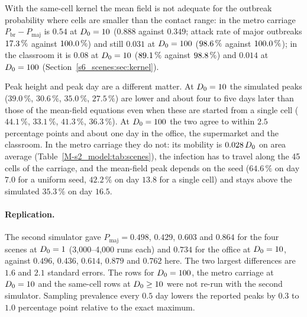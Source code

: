 With the same-cell kernel the mean field is not adequate for the outbreak probability where cells are smaller
than the contact range: in the metro carriage
$P_{\mathrm{br}}-P_{\mathrm{maj}}$ is $0.54$ at $D_0=10$ ($0.888$ against $0.349$; attack rate of major
outbreaks $17.3\,\%$ against $100.0\,\%$) and still $0.031$ at $D_0=100$ ($98.6\,\%$ against $100.0\,\%$); in the
classroom it is $0.08$ at $D_0=10$ ($89.1\,\%$ against $98.8\,\%$) and $0.014$ at $D_0=100$
(Section~\ref{s6_scenes:sec:kernel}).

Peak height and peak day are a different matter. At $D_0=10$ the simulated peaks ($39.0\,\%$, $30.6\,\%$, $35.0\,\%$,
$27.5\,\%$) are lower and about four to five days later than those of the mean-field equations even when these
are started from a single cell ($44.1\,\%$, $33.1\,\%$, $41.3\,\%$, $36.3\,\%$). At $D_0=100$ the two agree to within $2.5$
percentage points and about one day in the office, the supermarket and the classroom. In the metro carriage they
do not: its mobility is $0.028\,D_0$ on area average (Table~\ref{M-s2_model:tab:scenes}), the infection has to
travel along the 45 cells of the carriage, and the mean-field peak depends on the seed ($64.6\,\%$ on day $7.0$
for a uniform seed, $42.2\,\%$ on day $13.8$ for a single cell) and stays above the simulated $35.3\,\%$ on day
$16.5$.

\paragraph{Replication.}
The second simulator gave $P_{\mathrm{maj}}=0.498$, $0.429$, $0.603$ and $0.864$ for the four scenes at
$D_0=1$ (3{,}000--4{,}000 runs each) and $0.734$ for the office at $D_0=10$, against $0.496$, $0.436$, $0.614$,
$0.879$ and $0.762$ here. The two largest differences are $1.6$ and $2.1$ standard errors. The rows for
$D_0=100$, the metro carriage at $D_0=10$ and the same-cell rows at $D_0\ge10$ were not re-run with the second simulator. Sampling prevalence every $0.5$ day lowers the reported peaks by $0.3$
to $1.0$ percentage point relative to the exact maximum.

